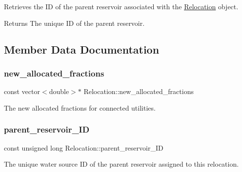 Retrieves the ID of the parent reservoir associated with the \mbox{\hyperlink{classRelocation}{Relocation}} object. 

\begin{DoxyReturn}{Returns}
The unique ID of the parent reservoir. 
\end{DoxyReturn}


\subsection{Member Data Documentation}
\mbox{\label{classRelocation_acc95d1be560fed2b4a1b4b2ae605ae67}} 
\subsubsection{\texorpdfstring{new\+\_\+allocated\+\_\+fractions}{new\_allocated\_fractions}}
{\footnotesize\ttfamily const vector$<$double$>$$\ast$ Relocation\+::new\+\_\+allocated\+\_\+fractions}



The new allocated fractions for connected utilities. 

\mbox{\label{classRelocation_a61282254064f00641aaec667a7eb0652}} 
\subsubsection{\texorpdfstring{parent\+\_\+reservoir\+\_\+\+ID}{parent\_reservoir\_ID}}
{\footnotesize\ttfamily const unsigned long Relocation\+::parent\+\_\+reservoir\+\_\+\+ID}



The unique water source ID of the parent reservoir assigned to this relocation. 

\mbox{\label{classRelocation_ae426f390487b6b67f19bfbf556c922c2}} 
